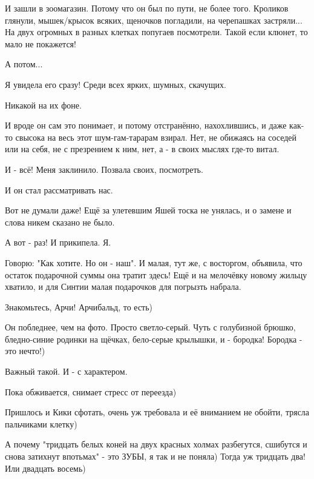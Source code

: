 И зашли в зоомагазин. Потому что он был по пути, не более того. Кроликов
глянули, мышек/крысок всяких, щеночков погладили, на черепашках застряли... На
двух огромных в разных клетках попугаев посмотрели. Такой если клюнет, то мало
не покажется!

А потом...

Я увидела его сразу! Среди всех ярких, шумных, скачущих.

Никакой на их фоне.

И вроде он сам это понимает, и потому отстранённо, нахохлившись, и даже как-то
свысока на весь этот шум-гам-тарарам взирал. Нет, не обижаясь на соседей или на
себя, не с презрением к ним, нет, а - в своих мыслях где-то витал. 

И - всё! Меня заклинило. Позвала своих, посмотреть. 

И он стал рассматривать нас. 

Вот не думали даже! Ещё за улетевшим Яшей тоска не унялась, и о замене и слова
никем сказано не было.

А вот - раз! И прикипела. Я. 

Говорю: "Как хотите. Но он - наш". И малая, тут же, с восторгом, объявила, что
остаток подарочной суммы она тратит здесь! Ещё и на мелочёвку новому жильцу
хватило, и для Синтии малая подарочков для погрызть набрала.

Знакомьтесь, Арчи! Арчибальд, то есть)

Он побледнее, чем на фото. Просто светло-серый. Чуть с голубизной брюшко,
бледно-синие родинки на щёчках, бело-серые крылышки, и - бородка! Бородка - это
нечто!)

Важный такой. И - с характером.

Пока обживается, снимает стресс от переезда)  

Пришлось и Кики сфотать, очень уж требовала и её вниманием не обойти, трясла
пальчиками клетку)

А почему "тридцать белых коней на двух красных холмах разбегутся, сшибутся и
снова затихнут впотьмах" - это ЗУБЫ, я так и не поняла) Тогда уж тридцать два!
Или двадцать восемь)

